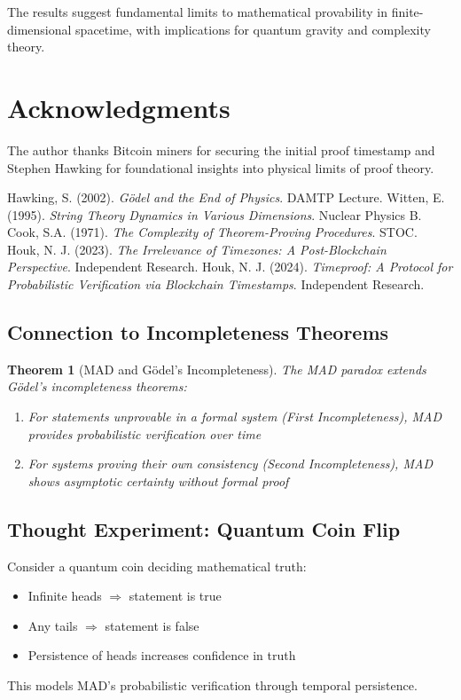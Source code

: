 \documentclass{article}
\newtheorem{theorem}{Theorem}
\begin{document}
The results suggest fundamental limits to mathematical provability in finite-dimensional spacetime, with implications for quantum gravity and complexity theory.

\section*{Acknowledgments}
The author thanks Bitcoin miners for securing the initial proof timestamp and Stephen Hawking for foundational insights into physical limits of proof theory.

\begin{thebibliography}{9}
Hawking, S. (2002). \textit{Gödel and the End of Physics}. DAMTP Lecture.
Witten, E. (1995). \textit{String Theory Dynamics in Various Dimensions}. Nuclear Physics B.
Cook, S.A. (1971). \textit{The Complexity of Theorem-Proving Procedures}. STOC.
Houk, N. J. (2023). \textit{The Irrelevance of Timezones: A Post-Blockchain Perspective}. Independent Research.
Houk, N. J. (2024). \textit{Timeproof: A Protocol for Probabilistic Verification via Blockchain Timestamps}. Independent Research.
\end{thebibliography}

\subsection{Connection to Incompleteness Theorems}
\begin{theorem}[MAD and Gödel's Incompleteness]
The MAD paradox extends Gödel's incompleteness theorems:
\begin{enumerate}
    \item For statements unprovable in a formal system (First Incompleteness), MAD provides probabilistic verification over time
    \item For systems proving their own consistency (Second Incompleteness), MAD shows asymptotic certainty without formal proof
\end{enumerate}
\end{theorem}

\subsection{Thought Experiment: Quantum Coin Flip}
Consider a quantum coin deciding mathematical truth:
\begin{itemize}
    \item Infinite heads $\Rightarrow$ statement is true
    \item Any tails $\Rightarrow$ statement is false
    \item Persistence of heads increases confidence in truth
\end{itemize}
This models MAD's probabilistic verification through temporal persistence.
\end{document}
